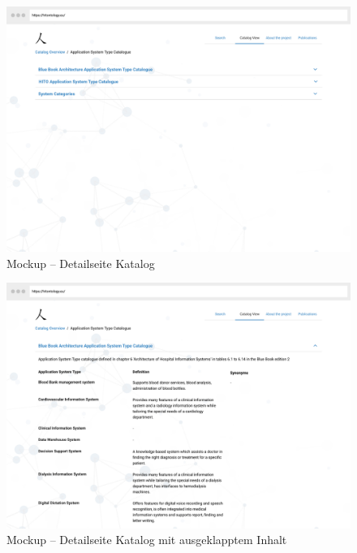 \begin{figure}[H]
	\centering
    	\includegraphics[width=1.45\textwidth, angle=-90]{Images/Mockup_Katalog_Detailseite}
   	\caption[Mockup -- Detailseite Katalog 1]{Mockup -- Detailseite Katalog}
   	\label{fig:mockup_catalogue_detail}
\end{figure}

\clearpage

\begin{figure}[ht]
	\centering
    	\includegraphics[width=1.45\textwidth, angle=-90]{Images/Mockup_Katalog_Detailseite_Ausgeklappt}
   	\caption[Mockup -- Detailseite Katalog 2]{Mockup -- Detailseite Katalog mit ausgeklapptem Inhalt}
   	\label{fig:mockup_catalogue_detail_expanded}
\end{figure}

